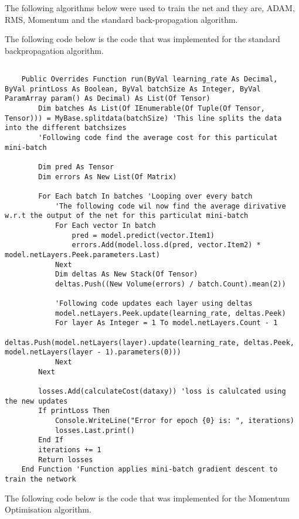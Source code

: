 The following algorithms below were used to train the net and they are, ADAM, RMS, Momentum and the standard back-propagation algorithm.

The following code below is the code that was implemented for the standard backpropagation algorithm.

\begin{verbatim}

    Public Overrides Function run(ByVal learning_rate As Decimal, ByVal printLoss As Boolean, ByVal batchSize As Integer, ByVal ParamArray param() As Decimal) As List(Of Tensor)
        Dim batches As List(Of IEnumerable(Of Tuple(Of Tensor, Tensor))) = MyBase.splitdata(batchSize) 'This line splits the data into the different batchsizes
        'Following code find the average cost for this particulat mini-batch 

        Dim pred As Tensor
        Dim errors As New List(Of Matrix)

        For Each batch In batches 'Looping over every batch
            'The following code wil now find the average dirivative w.r.t the output of the net for this particulat mini-batch
            For Each vector In batch
                pred = model.predict(vector.Item1)
                errors.Add(model.loss.d(pred, vector.Item2) * model.netLayers.Peek.parameters.Last)
            Next
            Dim deltas As New Stack(Of Tensor)
            deltas.Push((New Volume(errors) / batch.Count).mean(2))

            'Following code updates each layer using deltas
            model.netLayers.Peek.update(learning_rate, deltas.Peek)
            For layer As Integer = 1 To model.netLayers.Count - 1
                deltas.Push(model.netLayers(layer).update(learning_rate, deltas.Peek, model.netLayers(layer - 1).parameters(0)))
            Next
        Next

        losses.Add(calculateCost(dataxy)) 'loss is calulcated using the new updates
        If printLoss Then
            Console.WriteLine("Error for epoch {0} is: ", iterations)
            losses.Last.print()
        End If
        iterations += 1
        Return losses
    End Function 'Function applies mini-batch gradient descent to train the network

\end{verbatim}

The following code below is the code that was implemented for the Momentum Optimisation algorithm.

